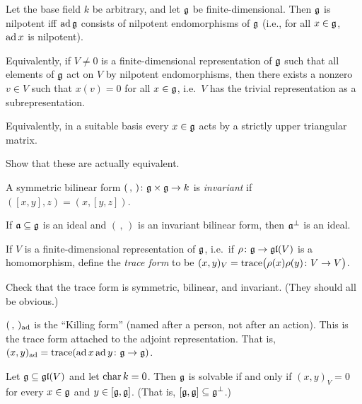 \begin{theorem}
Let the base field $k$ be arbitrary, and let $\mathfrak{g}$ be finite-dimensional. Then
$\mathfrak{g}$ is nilpotent iff $\operatorname{ad} \mathfrak{g}$ consists of nilpotent endomorphisms of $\mathfrak{g}$
(i.e., for all $x \in \mathfrak{g}$, $\operatorname{ad} x$ is nilpotent).

Equivalently, if $V \neq 0$ is a finite-dimensional representation of $\mathfrak{g}$ such
that all elements of $\mathfrak{g}$ act on $V$ by nilpotent endomorphisms, then there
exists a nonzero $v \in V$ such that $x(v) = 0$ for all $x \in \mathfrak{g}$, i.e.\ $V$
has the trivial representation as a subrepresentation.

Equivalently, in a suitable basis every $x \in \mathfrak{g}$ acts by a strictly upper
triangular matrix.
\end{theorem}

\begin{exercise}
Show that these are actually equivalent.
\end{exercise}


\begin{definition}
A symmetric bilinear form $(\,,\,)\colon \mathfrak{g} \times \mathfrak{g} \to k$ is
\emph{invariant} if $([x, y], z) = (x, [y, z])$.
\end{definition}

\begin{exercise}
If $\mathfrak{a} \subseteq \mathfrak{g}$ is an ideal and $(\,,\,)$ is an invariant bilinear form,
then $\mathfrak{a}^\perp$ is an ideal.
\end{exercise}

\begin{definition}
If $V$ is a finite-dimensional representation of $\mathfrak{g}$, i.e.\ if
$\rho\colon \mathfrak{g} \to \mathfrak{gl}(V)$ is a homomorphism, define the \emph{trace form} to
be $(x, y)_V = \operatorname{trace}\bigl(\rho(x)\rho(y)\colon V \to V\bigr)$.
\end{definition}

\begin{exercise}
Check that the trace form is symmetric, bilinear, and invariant. (They should
all be obvious.)
\end{exercise}

\begin{example}
$(\,,\,)_{\operatorname{ad}}$ is the ``Killing form'' (named after a person, not after an
action). This is the trace form attached to the adjoint representation. That
is, $(x, y)_{\operatorname{ad}} = \operatorname{trace}(\operatorname{ad} x \operatorname{ad} y\colon \mathfrak{g} \to \mathfrak{g})$.
\end{example}

\begin{theorem}
Let $\mathfrak{g} \subseteq \mathfrak{gl}(V)$ and let $\operatorname{char} k = 0$. Then $\mathfrak{g}$ is solvable if and
only if $(x, y)_V = 0$ for every $x \in \mathfrak{g}$ and $y \in [\mathfrak{g}, \mathfrak{g}]$. (That is,
$[\mathfrak{g}, \mathfrak{g}] \subseteq \mathfrak{g}^\perp$.)
\end{theorem}

